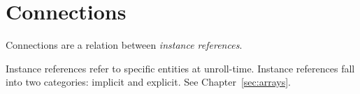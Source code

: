 

\chapter{Connections}
\label{sec:connections}

Connections are a relation between \emph{instance references}.  

Instance references refer to specific entities at unroll-time.  
Instance references fall into two categories: implicit and explicit.  
See Chapter~\ref{sec:arrays}.  

